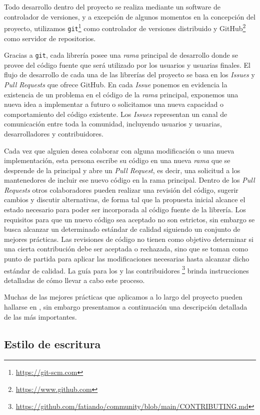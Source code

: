 Todo desarrollo dentro del proyecto se realiza mediante un software de
controlador de versiones, y a excepción de algunos momentos en la concepción
del proyecto, utilizamos \texttt{git}\footnote{\url{https://git-scm.com}} como
controlador de versiones distribuido
y GitHub\footnote{\url{https://www.github.com}} como servidor de repositorios.

Gracias a \texttt{git}, cada librería posee una \emph{rama} principal de
desarrollo donde se provee del código fuente que será utilizado por los
usuarios y usuarias finales.
El flujo de desarrollo de cada una de las librerías del proyecto se basa en los
\emph{Issues} y \emph{Pull Requests} que ofrece GitHub.
En cada \emph{Issue} ponemos en evidencia la existencia de un problema en el
código de la \emph{rama} principal, exponemos una nueva idea a implementar
a futuro o solicitamos una nueva capacidad o comportamiento del código
existente.
Los \emph{Issues} representan un canal de comunicación entre toda la comunidad,
incluyendo usuarios y usuarias, desarrolladores y contribuidores.

Cada vez que alguien desea colaborar con alguna modificación o una nueva
implementación, esta persona escribe su código en una nueva \emph{rama} que
se desprende de la principal y abre un \emph{Pull Request}, es decir, una
solicitud a los mantenedores de incluir ese nuevo código en la rama principal.
Dentro de los \emph{Pull Requests} otros colaboradores pueden realizar una
revisión del código, sugerir cambios y discutir alternativas, de forma tal que
la propuesta inicial alcance el estado necesario para poder ser incorporada
al código fuente de la librería.
Los requisitos para que un nuevo código sea aceptado no son estrictos, sin
embargo se busca alcanzar un determinado estándar de calidad siguiendo un
conjunto de mejores prácticas.
Las revisiones de código no tienen como objetivo determinar si una cierta
contribución debe ser aceptada o rechazada, sino que se toman como punto de
partida para aplicar las modificaciones necesarias hasta alcanzar dicho
estándar de calidad.
La guía para los y las
contribuidores%
\footnote{
    \url{https://github.com/fatiando/community/blob/main/CONTRIBUTING.md}%
}
brinda instrucciones detalladas de cómo llevar a cabo este proceso.

Muchas de las mejores prácticas que aplicamos a lo largo del proyecto pueden
hallarse en \citet{wilson2014,wilson2017}, sin embargo presentamos
a continuación una descripción detallada de las más importantes.

\subsection{Estilo de escritura}

